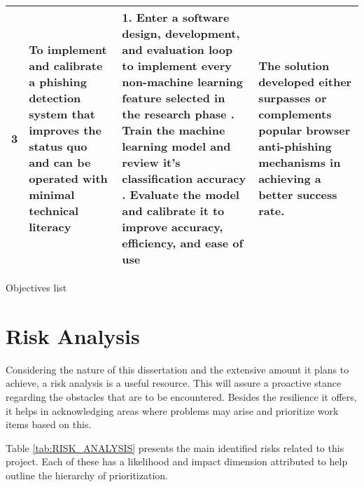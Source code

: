 \begin{landscape}
\begin{singlespace}
\begin{center}
\begin{tabular}{ | m{0.5em} | m{18.5em} | m{23em}| m{16em} | }
				\hline
				\textbf{3}  &
				To implement and calibrate a phishing detection system that
				improves the status quo and can be operated with minimal
				technical literacy
				            &
				1. Enter a software design, development, and evaluation loop to
				implement every non-machine learning feature selected in the
				research phase
				\newline\newline
				2. Train the machine learning model and review it's
				classification accuracy
				\newline\newline
				3. Evaluate the model and calibrate it to improve accuracy,
				efficiency, and ease of use
				            &
				The solution developed either surpasses or complements popular
				browser anti-phishing mechanisms in achieving a better success
				rate.                                                           \\

				\hline
			\end{tabular}
			\captionsetup{type=table}\caption{Objectives list}
		\end{center}
	\end{singlespace}
\end{landscape}
\section{Risk Analysis}

Considering the nature of this dissertation and the extensive amount it
plans to achieve, a risk analysis is a useful resource. This will assure a
proactive stance regarding the obstacles that are to be encountered. Besides the
resilience it offers, it helps in acknowledging areas where problems may arise
and prioritize work items based on this.

Table \ref{tab:RISK_ANALYSIS} presents the main identified risks related to
this project. Each of these has a likelihood and impact dimension attributed to
help outline the hierarchy of prioritization.

